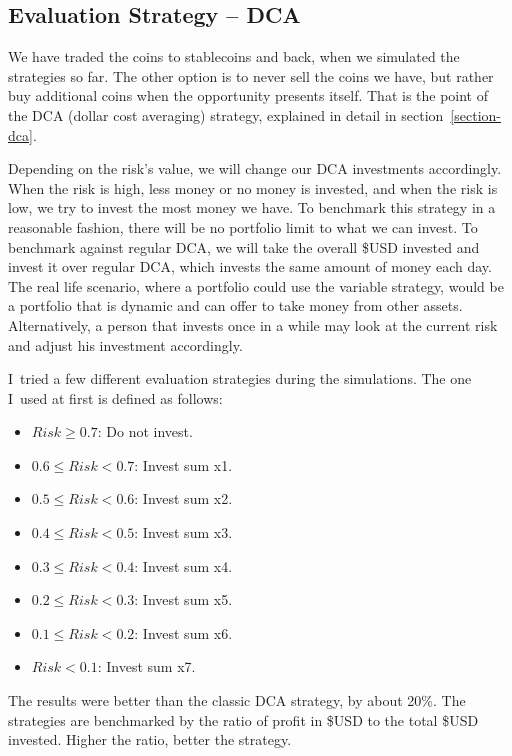 \subsection*{Evaluation Strategy -- DCA}
\label{subsection-eval-dca}
We have traded the coins to stablecoins and back, when we simulated the strategies so far. The other option is to never sell the coins we have, but rather buy additional coins when the opportunity presents itself. That is the point of the DCA (dollar cost averaging) strategy, explained in detail in section~\ref{section-dca}.

Depending on the risk's value, we will change our DCA investments accordingly. When the risk is high, less money or no money is invested, and when the risk is low, we try to invest the most money we have. To benchmark this strategy in a reasonable fashion, there will be no portfolio limit to what we can invest. To benchmark against regular DCA, we will take the overall \$USD invested and invest it over regular DCA, which invests the same amount of money each day. The real life scenario, where a portfolio could use the variable strategy, would be a portfolio that is dynamic and can offer to take money from other assets. Alternatively, a person that invests once in a while may look at the current risk and adjust his investment accordingly.

I~tried a few different evaluation strategies during the simulations. The one I~used at first is defined as follows:
\begin{itemize}
    \item $Risk \ge  0.7$: Do not invest.
    \item $0.6 \le Risk < 0.7$: Invest sum x1.
    \item $0.5 \le Risk < 0.6$: Invest sum x2.
    \item $0.4 \le Risk < 0.5$: Invest sum x3.
    \item $0.3 \le Risk < 0.4$: Invest sum x4.
    \item $0.2 \le Risk < 0.3$: Invest sum x5.
    \item $0.1 \le Risk < 0.2$: Invest sum x6.
    \item $Risk < 0.1$: Invest sum x7.
\end{itemize}

The results were better than the classic DCA strategy, by about 20\%. The strategies are benchmarked by the ratio of profit in \$USD to the total \$USD invested. Higher the ratio, better the strategy.

